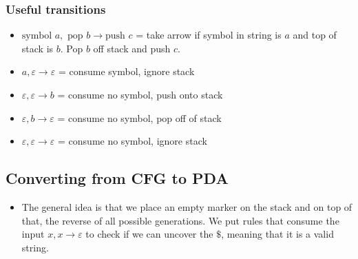 \documentclass{article}
\begin{document}
\subsubsection{Useful transitions}
\begin{itemize}
    \item $\textrm{symbol } a, \textrm{ pop } b \to \textrm{push } c$ = take arrow if symbol in string is $a$ and top of stack is $b$. Pop $b$ off stack and push $c$.
    \item $a, \varepsilon \to \varepsilon$ = consume symbol, ignore stack
    \item $\varepsilon, \varepsilon \to b$ = consume no symbol, push onto stack
    \item $\varepsilon, b \to \varepsilon$ = consume no symbol, pop off of stack
    \item $\varepsilon, \varepsilon \to \varepsilon$ = consume no symbol, ignore stack
\end{itemize}

\subsection{Converting from CFG to PDA}
\begin{itemize}
    \item The general idea is that we place an empty marker on the stack and on top of that, the reverse of all possible generations. We put rules that consume the input $x, x\to \varepsilon$ to check if we can uncover the $\$$, meaning that it is a valid string.
    
\end{itemize}
\end{document}
